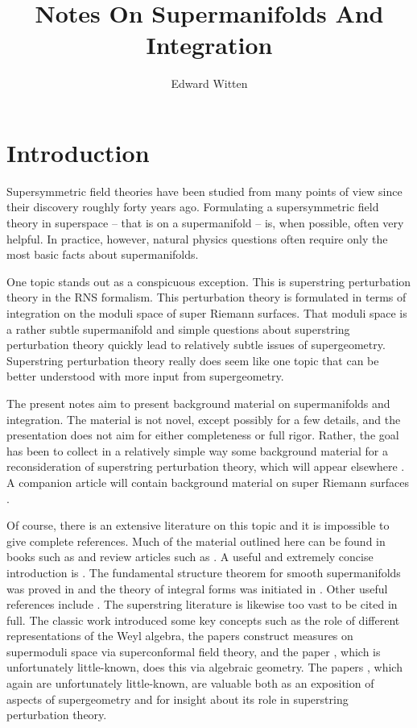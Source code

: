 \documentclass[11pt,a4paper]{article}
\title{Notes On Supermanifolds And Integration}
\author{Edward Witten}
\affiliation{School of Natural Sciences, Institute for Advanced Study,\\ 1 Einstein Drive, Princeton, NJ 08540 USA}
\begin{document}
 \maketitle


\section{Introduction}\label{intro}


Supersymmetric field theories have been studied from many points of view since their discovery roughly forty years ago.
Formulating a supersymmetric field theory in superspace -- that is on a supermanifold -- is, when possible,  often very helpful.
In practice, however, natural physics questions often require only the most basic facts about supermanifolds.

One topic  stands out as a conspicuous exception.  This is superstring perturbation theory in the RNS formalism.  This perturbation
theory is formulated in terms of integration on the moduli space of super Riemann surfaces.  That moduli space is a rather subtle supermanifold
and simple questions about superstring perturbation theory quickly lead to relatively subtle issues of supergeometry.  Superstring perturbation theory
really does seem like one topic that can be better understood with more input from supergeometry.

The present notes aim to present background material on supermanifolds and integration.
The material is not novel, except possibly for a few details, and the presentation does not aim for either completeness or full rigor.  Rather, the goal has been to collect in 
a relatively simple way some background material for a reconsideration of superstring perturbation theory, which  will appear 
elsewhere \cite{reconsidered}.    A companion article will contain background
material on super Riemann surfaces \cite{supersurf}.  

Of course, there is an extensive literature on this topic and it is impossible to give complete references.  
Much of the material outlined here can be found in books such as \cite{Berezin,Manin,DeWitt,Rogers}
and review articles such as \cite{Kac,Leites,Voronov,Nelson}.  A useful and extremely concise introduction is \cite{DEF}.
  The fundamental 
structure theorem for smooth supermanifolds was proved in \cite{Ber,Bach,Gaw} and
the theory of integral forms was initiated in \cite{BL}.  Other useful references include \cite{BaSch,VZ,VZtwo,GMM}.
The superstring literature is likewise too vast to be cited in full.   The classic work \cite{FMS} introduced some key concepts such as the role of different
representations of the Weyl algebra, the papers \cite{MNP,DPh,superoperator,EHVerl} construct measures on supermoduli space via superconformal field theory, and
the paper \cite{RSV}, which is unfortunately little-known, does this via algebraic geometry.  The papers \cite{Bel,Beltwo,Belthree}, which again are unfortunately little-known, 
are valuable both as an exposition of aspects of supergeometry
and for insight about its role in superstring perturbation theory.
\end{document}
